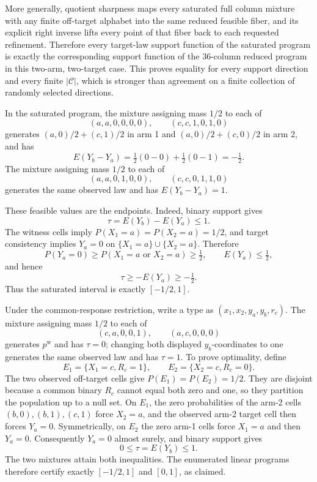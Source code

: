 More generally, quotient sharpness maps every saturated full column mixture with any finite off-target alphabet into the same reduced feasible fiber, and its explicit right inverse lifts every point of that fiber back to each requested refinement.  Therefore every target-law support function of the saturated program is exactly the corresponding support function of the 36-column reduced program in this two-arm, two-target case.  This proves equality for every support direction and every finite \(|\mathcal C|\), which is stronger than agreement on a finite collection of randomly selected directions.

In the saturated program, the mixture assigning mass \(1/2\) to each of
\[
(a,a,0,0,0,0),\qquad(c,c,1,0,1,0)
\]
generates \((a,0)/2+(c,1)/2\) in arm 1 and \((a,0)/2+(c,0)/2\) in arm 2, and has
\[
E(Y_b-Y_a)=\tfrac12(0-0)+\tfrac12(0-1)=-\tfrac12.
\]
The mixture assigning mass \(1/2\) to each of
\[
(a,a,0,1,0,0),\qquad(c,c,0,1,1,0)
\]
generates the same observed law and has \(E(Y_b-Y_a)=1\).

These feasible values are the endpoints.  Indeed, binary support gives
\[
\tau=E(Y_b)-E(Y_a)\le1.
\]
The witness cells imply \(P(X_1=a)=P(X_2=a)=1/2\), and target consistency implies \(Y_a=0\) on \(\{X_1=a\}\cup\{X_2=a\}\).  Therefore
\[
P(Y_a=0)\ge P(X_1=a\text{ or }X_2=a)\ge\tfrac12,
\qquad E(Y_a)\le\tfrac12,
\]
and hence
\[
\tau\ge-E(Y_a)\ge-\tfrac12.
\]
Thus the saturated interval is exactly \([-1/2,1]\).

Under the common-response restriction, write a type as \((x_1,x_2,y_a,y_b,r_c)\).  The mixture assigning mass \(1/2\) to each of
\[
(c,a,0,0,1),\qquad(a,c,0,0,0)
\]
generates \(p^{\mathrm w}\) and has \(\tau=0\); changing both displayed \(y_b\)-coordinates to one generates the same observed law and has \(\tau=1\).  To prove optimality, define
\[
E_1=\{X_1=c,R_c=1\},\qquad E_2=\{X_2=c,R_c=0\}.
\]
The two observed off-target cells give \(P(E_1)=P(E_2)=1/2\).  They are disjoint because a common binary \(R_c\) cannot equal both zero and one, so they partition the population up to a null set.  On \(E_1\), the zero probabilities of the arm-2 cells \((b,0),(b,1),(c,1)\) force \(X_2=a\), and the observed arm-2 target cell then forces \(Y_a=0\).  Symmetrically, on \(E_2\) the zero arm-1 cells force \(X_1=a\) and then \(Y_a=0\).  Consequently \(Y_a=0\) almost surely, and binary support gives
\[
0\le\tau=E(Y_b)\le1.
\]
The two mixtures attain both inequalities.  The enumerated linear programs therefore certify exactly \([-1/2,1]\) and \([0,1]\), as claimed.

